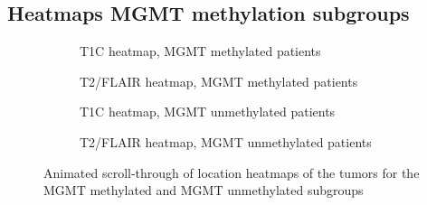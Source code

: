 \begin{subappendices}
        \section{Heatmaps MGMT methylation subgroups}
        \begin{figure}[H]
            \centering
            \begin{subfigure}[t]{0.4\textwidth}
                \centering
                \caption{\acrshort{T1C} heatmap, \gls{MGMT} methylated patients}\label{fig:HGG_loc_T1_heatmap_methylated}
            \end{subfigure}
            \hfill
            \begin{subfigure}[t]{0.4\textwidth}
                \centering
                \caption{\acrshort{T2}/\acrshort{FLAIR} heatmap, \gls{MGMT} methylated patients}\label{fig:HGG_loc_T2_heatmap_methylated}
            \end{subfigure}

            \begin{subfigure}[t]{0.4\textwidth}
                \centering
                \caption{\acrshort{T1C} heatmap, \acrshort{MGMT} unmethylated patients}\label{fig:HGG_loc_T1_heatmap_unmethylated}
            \end{subfigure}
            \hfill
            \begin{subfigure}[t]{0.4\textwidth}
                \centering
                \caption{\acrshort{T2}/\acrshort{FLAIR} heatmap, \acrshort{MGMT} unmethylated patients}\label{fig:HGG_loc_T2_heatmap_unmethylated}
            \end{subfigure}
            \caption{Animated scroll-through of location heatmaps of the \glspl{tumor} for the MGMT methylated and MGMT unmethylated subgroups}\label{fig:HGG_local_heatmaps_subgroups}
        \end{figure}


        \newpage

\end{subappendices}
